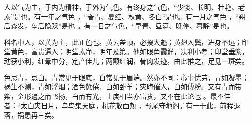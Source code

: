 \documentclass[12pt,UTF8]{ctexbook}
\begin{document}
人以气为主，于内为精神，于外为气色。有终身之气色，“少淡、长明、壮艳、老素”是也。有一年之气色 ，“春青、夏红、秋黄、冬白“是也。有一月之气色 ，“朔后森发，望后隐跃”是也 。有一日之气色，“早青、昼满、晚停、暮静”是也。 

科名中人，以黄为主，此正色也。黄云盖顶，必掇大魁；黄翅入鬓，进身不远；印堂黄色，富贵逼人；明堂素净，明年及第。他如眼角霞鲜，决利小考；印堂垂紫，动获小利，红晕中分，定产佳儿；两颧红润，骨肉发迹。由此推之，足见一斑矣。

色忌青，忌白。青常见于眼底，白常见于眉端。然亦不同：心事忧劳，青如凝墨；祸生不测，青如浮烟；酒色惫倦，白如卧羊；灾晦催人，白如傅粉。又有青而带紫，金形遇之而飞扬，白而有光，土庚相当亦富贵，又不在此论也 。最不佳者：“太白夹日月，乌鸟集天庭，桃花散面颊 ，预尾守地阁。”有一于此，前程退落，祸患再三矣。 
\end{document}
